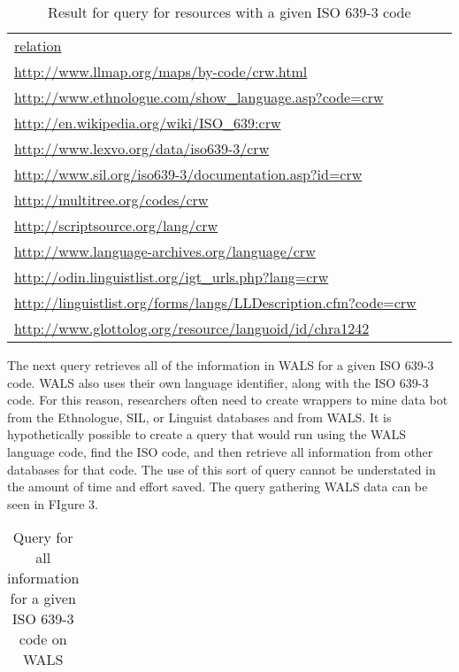 \begin{table*}
\caption{Result for query for resources with a given ISO 639-3 code} \label{t1}
\begin{tabular}{lll}
\hline
\url{relation} \\
\url{http://www.llmap.org/maps/by-code/crw.html} \\
\url{http://www.ethnologue.com/show_language.asp?code=crw} \\
\url{http://en.wikipedia.org/wiki/ISO_639:crw} \\
\url{http://www.lexvo.org/data/iso639-3/crw} \\
\url{http://www.sil.org/iso639-3/documentation.asp?id=crw} \\
\url{http://multitree.org/codes/crw} \\
\url{http://scriptsource.org/lang/crw} \\
\url{http://www.language-archives.org/language/crw} \\
\url{http://odin.linguistlist.org/igt_urls.php?lang=crw} \\
\url{http://linguistlist.org/forms/langs/LLDescription.cfm?code=crw} \\
\url{http://www.glottolog.org/resource/languoid/id/chra1242} \\
\hline
\end{tabular}
\end{table*}


The next query retrieves all of the information in WALS for a given ISO 639-3 code. WALS also uses their own language identifier, along with the ISO 639-3 code. For this reason, researchers often need to create wrappers to mine data bot from the Ethnologue, SIL, or Linguist databases and from WALS. It is hypothetically possible to create a query that would run using the WALS language code, find the ISO code, and then retrieve all information from other databases for that code. The use of this sort of query cannot be understated in the amount of time and effort saved. The query gathering WALS data can be seen in FIgure 3. 

\begin{table*}
\caption{Query for all information for a given ISO 639-3 code on WALS} \label{t1}
\begin{tabular}{lll}
\hline
{\footnotesize } \\
\hline
\end{tabular}
\end{table*}

